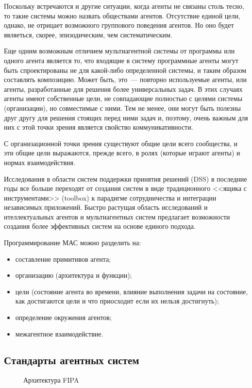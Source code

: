 Поскольку встречаются и другие ситуации, когда агенты не связаны столь тесно, то такие системы можно назвать обществами агентов. Отсутствие единой цели, однако, не отрицает возможного группового поведения агентов. Но оно будет являеться, скорее, эпизодическим, чем систематическим.

Еще одним возможным отличием мультиагентной системы от программы или одного агента является то, что входящие в систему программные агенты могут быть спроектированы не для какой-либо определенной системы, и таким образом составлять композицию. Может быть, это~--- повторно используемые агенты, или агенты, разработанные для решения более универсальных задач. В этих случаях агенты имеют собственные цели, не совпадающие полностью с целями системы (организации), но совместимые с ними. Тем не менее, они могут быть полезны друг другу для решения стоящих перед ними задач и, поэтому, очень важным для них с этой точки зрения является свойство коммуникативности.

С организационной точки зрения существуют общие цели всего сообщества, и эти общие цели выражаются, прежде всего, в ролях (которые играют агенты) и нормах взаимодействия.

Исследования в области систем поддержки принятия решений (DSS) в последние годы все больше переходят от создания систем в виде традиционного <<ящика с инструментами>> (toolbox) к парадигме сотрудничества и интеграции независимых приложений. Быстро растущая область исследований и нтеллектуальных агентов и мультиагентных систем предлагает возможности создания более эффективных систем на основе единого подхода.

Программирование МАС можно разделить на:
\begin{itemize}
\item составление примитивов агента;
\item организацию (архитектура и функции);
\item цели (состояние агента во времени, влияние выполнения задачи на состояние, как достигаются цели и что приосходит если их нельзя достигнуть);
\item определение окружения агентов;
\item межагентное взаимодействие.
\end{itemize}

\subsection{Стандарты агентных систем}
\begin{figure}[h]
\caption{Архитектура FIPA}
\label{1:fipa}
\end{figure}

